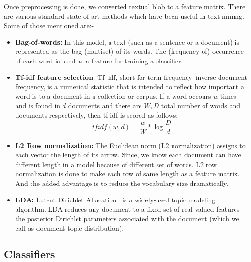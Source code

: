 \documentclass{article} %
\begin{document}
Once preprocessing is done, we converted textual blob to a feature matrix. There are various standard state of art methods which have been useful in text mining. Some of those mentioned are:-

\begin{itemize}
  \item \textbf{Bag-of-words:} In this model, a text (such as a sentence or a document) is represented as the bag (multiset) of its words. The (frequency of) occurrence of each word is used as a feature for training a classifier.
    \item \textbf{Tf-idf feature selection:} Tf–idf, short for term frequency–inverse document frequency, is a numerical statistic that is intended to reflect how important a word is to a document in a collection or corpus. If a word occours $w$ times
  and is found in $d$ documents  and there
  are $W,D$ total number of words and documents respectively, then tf-idf is scored
  as follows:
  \[
  \mathit{tfidf}(w,d)=   \frac{w}{W} *\log{\frac{D}{d}}\]
  \item \textbf{L2 Row normalization:} The Euclidean norm (L2 normalization) assigns to each vector the length of its arrow. Since, we know each document can have different length in a model because of different set of words. L2 row normalization is done to make each row of same length as a feature matrix. And the added advantage is to reduce the vocabulary size dramatically.
  \item \textbf{LDA:} Latent Dirichlet Allocation~\cite{blei2003latent} is a widely-used topic modeling algorithm.  LDA reduces any document to a fixed set of real-valued features—the posterior Dirichlet parameters associated with the document (which we call as document-topic distribution).
\end{itemize}

\subsection{Classifiers}
\label{classifier}
\end{document}
